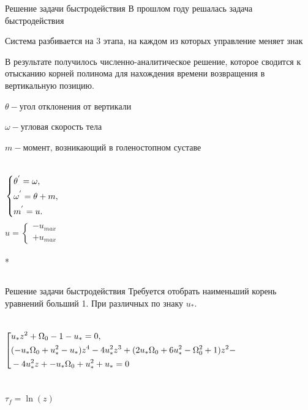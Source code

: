 \documentclass[10pt]{beamer}
\begin{document}
\begin{frame}{Решение задачи быстродействия}
	В прошлом году решалась задача быстродействия

	Система разбивается на 3 этапа, на каждом из которых управление меняет знак

	В результате получилось численно-аналитическое решение, которое сводится к отысканию корней полинома для нахождения времени возвращения в вертикальную позицию.

	$\theta - \text{угол отклонения от вертикали}$

	$\omega - \text{угловая скорость тела}$

	$m - \text{момент, возникающий в голеностопном суставе}$


	\begin{columns}
		\begin{equation}\label{koshisystem}
			\left\{ {\begin{aligned}
						 & \theta^{'} = \omega , \hfill   \\
						 & \omega^{'} = \theta+m , \hfill \\
						 & m^{'} = u . \hfill             \\
					\end{aligned}} \right.
		\end{equation}
		\[
			u=
			\begin{cases}
				-u_{max} \\
				+u_{max}
			\end{cases}
		\]\\*
	\end{columns}

\end{frame}

\begin{frame}{Решение задачи быстродействия}
	Требуется отобрать наименьший корень уравнений больший 1. При различных по знаку $u_*$.

		\begin{columns}
			\column{1\textwidth}
			\begin{equation}\label{koshisystem}
				\left[ {\begin{aligned}
					& u_*z^2+\Omega _0-1-u_*=0, \hfill    \\
					& (-u_* \Omega _0+u_*^2-u_*)z^4-4 u_*^2z^3+(2 u_* \Omega _0+6 u_*^2-\Omega _0^2+1)z^2- \hfill \\
					& -4 u_*^2z+-u_* \Omega _0+u_*^2+u_*=0 \hfill    \\
			   \end{aligned}} \right.
			\end{equation}
		\end{columns}
		$\tau_f=\ln(z)$

\end{frame}
\end{document}
